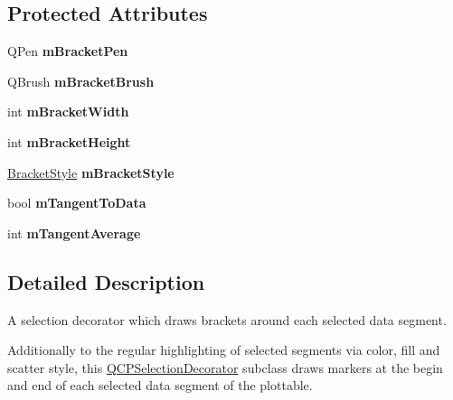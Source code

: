 \subsection*{Protected Attributes}
\begin{DoxyCompactItemize}
\item 
\mbox{\label{classQCPSelectionDecoratorBracket_ac7da5610713e67e92d0a882ef743a453}} 
Q\+Pen {\bfseries m\+Bracket\+Pen}
\item 
\mbox{\label{classQCPSelectionDecoratorBracket_ae905dd458b85ac529fb9c6ec879e5680}} 
Q\+Brush {\bfseries m\+Bracket\+Brush}
\item 
\mbox{\label{classQCPSelectionDecoratorBracket_a333983308322d10968c35bf2af4b392d}} 
int {\bfseries m\+Bracket\+Width}
\item 
\mbox{\label{classQCPSelectionDecoratorBracket_a3887d29b82f4dec3bf2ddf97d5475b16}} 
int {\bfseries m\+Bracket\+Height}
\item 
\mbox{\label{classQCPSelectionDecoratorBracket_a5ed4965200caa115da1a49f2f860e23c}} 
\hyperlink{classQCPSelectionDecoratorBracket_aa6d18517ec0553575bbef0de4252336e}{Bracket\+Style} {\bfseries m\+Bracket\+Style}
\item 
\mbox{\label{classQCPSelectionDecoratorBracket_ac08c7de0fd81b64b0f3fe31739688081}} 
bool {\bfseries m\+Tangent\+To\+Data}
\item 
\mbox{\label{classQCPSelectionDecoratorBracket_a810900616f17964cab140cbc13f40203}} 
int {\bfseries m\+Tangent\+Average}
\end{DoxyCompactItemize}


\subsection{Detailed Description}
A selection decorator which draws brackets around each selected data segment. 

Additionally to the regular highlighting of selected segments via color, fill and scatter style, this \hyperlink{classQCPSelectionDecorator}{Q\+C\+P\+Selection\+Decorator} subclass draws markers at the begin and end of each selected data segment of the plottable.

